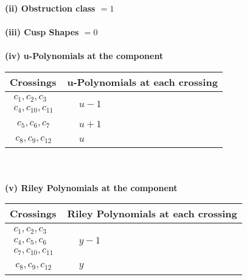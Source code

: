 \documentclass[1p]{elsarticle_modified}
\theoremstyle{definition}
\begin{document}
\flushleft \textbf{(ii) Obstruction class $= 1$}\\~\\
\flushleft \textbf{(iii) Cusp Shapes $= 0$}\\~\\
\newpage\renewcommand{\arraystretch}{1}
\flushleft \textbf{(iv) u-Polynomials at the component}\newline \\
\begin{tabular}{m{50pt}|m{274pt}}
Crossings & \hspace{64pt}u-Polynomials at each crossing \\
\hline $$\begin{aligned}c_{1},c_{2},c_{3}\\c_{4},c_{10},c_{11}\end{aligned}$$&$\begin{aligned}
&u-1
\end{aligned}$\\
\hline $$\begin{aligned}c_{5},c_{6},c_{7}\end{aligned}$$&$\begin{aligned}
&u+1
\end{aligned}$\\
\hline $$\begin{aligned}c_{8},c_{9},c_{12}\end{aligned}$$&$\begin{aligned}
&u
\end{aligned}$\\
\hline
\end{tabular}\\~\\
\newpage\renewcommand{\arraystretch}{1}
\flushleft \textbf{(v) Riley Polynomials at the component}\newline \\
\begin{tabular}{m{50pt}|m{274pt}}
Crossings & \hspace{64pt}Riley Polynomials at each crossing \\
\hline $$\begin{aligned}c_{1},c_{2},c_{3}\\c_{4},c_{5},c_{6}\\c_{7},c_{10},c_{11}\end{aligned}$$&$\begin{aligned}
&y-1
\end{aligned}$\\
\hline $$\begin{aligned}c_{8},c_{9},c_{12}\end{aligned}$$&$\begin{aligned}
&y
\end{aligned}$\\
\hline
\end{tabular}\\~\\
\end{document}
